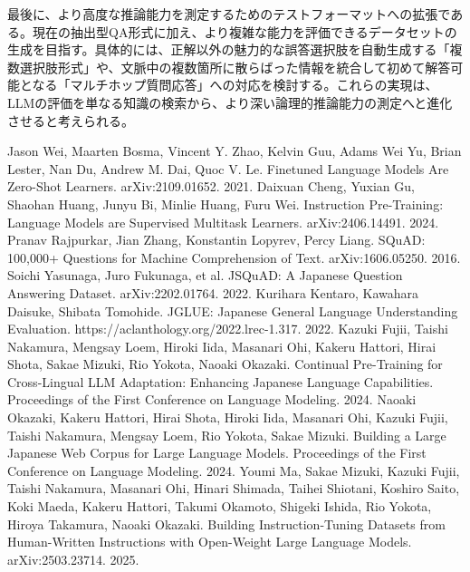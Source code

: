 \documentclass[twocolumn]{jsarticle}
\begin{document}
最後に、より高度な推論能力を測定するためのテストフォーマットへの拡張である。現在の抽出型QA形式に加え、より複雑な能力を評価できるデータセットの生成を目指す。具体的には、正解以外の魅力的な誤答選択肢を自動生成する「複数選択肢形式」や、文脈中の複数箇所に散らばった情報を統合して初めて解答可能となる「マルチホップ質問応答」への対応を検討する。これらの実現は、LLMの評価を単なる知識の検索から、より深い論理的推論能力の測定へと進化させると考えられる。



\begin{thebibliography}{99}
  Jason Wei, Maarten Bosma, Vincent Y. Zhao, Kelvin Guu, Adams Wei Yu, Brian Lester, Nan Du, Andrew M. Dai, Quoc V. Le. Finetuned Language Models Are Zero-Shot Learners. arXiv:2109.01652. 2021.
  Daixuan Cheng, Yuxian Gu, Shaohan Huang, Junyu Bi, Minlie Huang, Furu Wei. Instruction Pre-Training: Language Models are Supervised Multitask Learners. arXiv:2406.14491. 2024.
  Pranav Rajpurkar, Jian Zhang, Konstantin Lopyrev, Percy Liang. SQuAD: 100,000+ Questions for Machine Comprehension of Text. arXiv:1606.05250. 2016.
  Soichi Yasunaga, Juro Fukunaga, et al. JSQuAD: A Japanese Question Answering Dataset. arXiv:2202.01764. 2022.
  Kurihara Kentaro, Kawahara Daisuke, Shibata Tomohide. JGLUE: Japanese General Language Understanding Evaluation. https://aclanthology.org/2022.lrec-1.317. 2022.
  Kazuki Fujii, Taishi Nakamura, Mengsay Loem, Hiroki Iida, Masanari Ohi, Kakeru Hattori, Hirai Shota, Sakae Mizuki, Rio Yokota, Naoaki Okazaki. Continual Pre-Training for Cross-Lingual LLM Adaptation: Enhancing Japanese Language Capabilities. Proceedings of the First Conference on Language Modeling. 2024.
  Naoaki Okazaki, Kakeru Hattori, Hirai Shota, Hiroki Iida, Masanari Ohi, Kazuki Fujii, Taishi Nakamura, Mengsay Loem, Rio Yokota, Sakae Mizuki. Building a Large Japanese Web Corpus for Large Language Models. Proceedings of the First Conference on Language Modeling. 2024.
  Youmi Ma, Sakae Mizuki, Kazuki Fujii, Taishi Nakamura, Masanari Ohi, Hinari Shimada, Taihei Shiotani, Koshiro Saito, Koki Maeda, Kakeru Hattori, Takumi Okamoto, Shigeki Ishida, Rio Yokota, Hiroya Takamura, Naoaki Okazaki. Building Instruction-Tuning Datasets from Human-Written Instructions with Open-Weight Large Language Models. arXiv:2503.23714. 2025.
\end{thebibliography}
\end{document}
